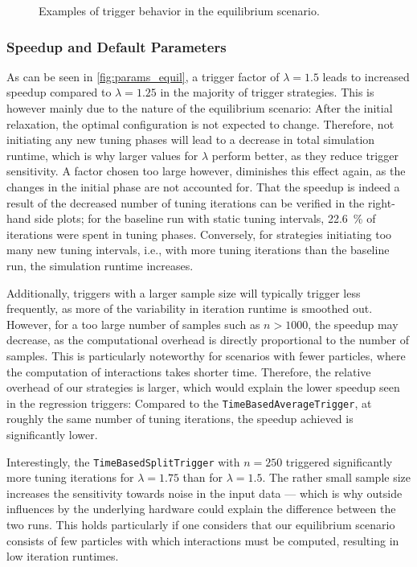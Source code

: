\begin{figure}[htpb]
\begin{subfigure}[t]{0.5\textwidth}
		\vspace*{-1cm}
	\end{subfigure}
	\caption{Examples of trigger behavior in the equilibrium scenario.}
	\label{fig:equilibrium_trigger_behavior}
\end{figure}



\subsubsection{Speedup and Default Parameters}

As can be seen in \autoref{fig:params_equil}, a trigger factor of $\lambda=1.5$ leads to increased speedup compared to $\lambda=1.25$ in the majority of trigger strategies. This is however mainly due to the nature of the equilibrium scenario: After the initial relaxation, the optimal configuration is not expected to change.
Therefore, not initiating any new tuning phases will lead to a decrease in total simulation runtime, which is why larger values for $\lambda$ perform better, as they reduce trigger sensitivity. A factor chosen too large however, diminishes this effect again, as the changes in the initial phase are not accounted for. That the speedup is indeed  a result of the decreased number of tuning iterations can be verified in the right-hand side plots; for the baseline run with static tuning intervals, \qty{22.6}{\percent} of iterations were spent in tuning phases.
Conversely, for strategies initiating too many new tuning intervals, i.e., with more tuning iterations than the baseline run, the simulation runtime increases.

Additionally, triggers with a larger sample size will typically trigger less frequently, as more of the variability in iteration runtime is smoothed out. However, for a too large number of samples such as $n>1000$, the speedup may decrease, as the computational overhead is directly proportional to the number of samples. This is particularly noteworthy for scenarios with fewer particles, where the computation of interactions takes shorter time. Therefore, the relative overhead of our strategies is larger, which would explain the lower speedup seen in the regression triggers: Compared to the \texttt{TimeBasedAverageTrigger}, at roughly the same number of tuning iterations, the speedup achieved is significantly lower.

Interestingly, the \texttt{TimeBasedSplitTrigger} with $n=250$ triggered significantly more tuning iterations for $\lambda=1.75$ than for $\lambda=1.5$.  The rather small sample size increases the sensitivity towards noise in the input data --- which is why outside influences by the underlying hardware could explain the difference between the two runs. This holds particularly if one considers that our equilibrium scenario consists of few particles with which interactions must be computed, resulting in low iteration runtimes.


